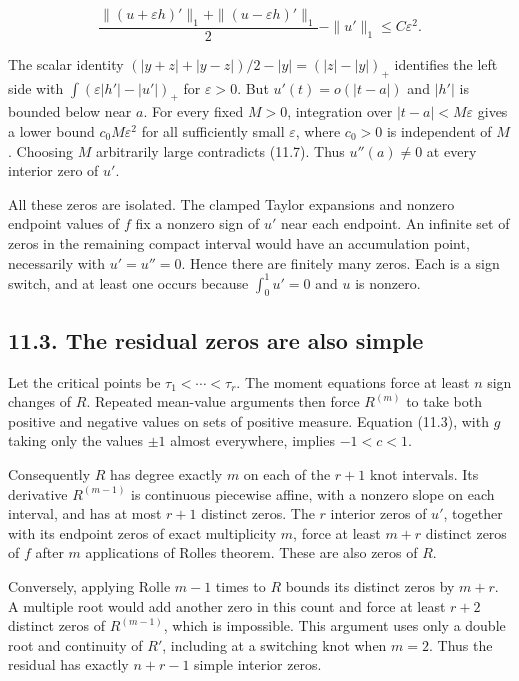 \documentclass[11pt]{article}
\begin{document}
\[
\frac{\|(u+\varepsilon h)'\|_1+\|(u-\varepsilon h)'\|_1}{2}
-\|u'\|_1\le C\varepsilon^2.
\tag{11.7}
\]

The scalar identity \((|y+z|+|y-z|)/2-|y|=(|z|-|y|)_+\) identifies the
left side with \(\int(\varepsilon|h'|-|u'|)_+\) for \(\varepsilon>0\).
But \(u'(t)=o(|t-a|)\) and \(|h'|\) is bounded below near \(a\). For
every fixed \(M>0\), integration over \(|t-a|<M\varepsilon\) gives a
lower bound \(c_0M\varepsilon^2\) for all sufficiently small
\(\varepsilon\), where \(c_0>0\) is independent of \(M\). Choosing \(M\)
arbitrarily large contradicts (11.7). Thus \(u''(a)\ne0\) at every
interior zero of \(u'\).

All these zeros are isolated. The clamped Taylor expansions and nonzero
endpoint values of \(f\) fix a nonzero sign of \(u'\) near each
endpoint. An infinite set of zeros in the remaining compact interval
would have an accumulation point, necessarily with \(u'=u''=0\). Hence
there are finitely many zeros. Each is a sign switch, and at least one
occurs because \(\int_0^1u'=0\) and \(u\) is nonzero.

\subsection{11.3. The residual zeros are also
simple}\label{the-residual-zeros-are-also-simple}

Let the critical points be \(\tau_1<\cdots<\tau_r\). The moment
equations force at least \(n\) sign changes of \(R\). Repeated
mean-value arguments then force \(R^{(m)}\) to take both positive and
negative values on sets of positive measure. Equation (11.3), with \(g\)
taking only the values \(\pm1\) almost everywhere, implies \(-1<c<1\).

Consequently \(R\) has degree exactly \(m\) on each of the \(r+1\) knot
intervals. Its derivative \(R^{(m-1)}\) is continuous piecewise affine,
with a nonzero slope on each interval, and has at most \(r+1\) distinct
zeros. The \(r\) interior zeros of \(u'\), together with its endpoint
zeros of exact multiplicity \(m\), force at least \(m+r\) distinct zeros
of \(f\) after \(m\) applications of Rolle\textquotesingle s theorem.
These are also zeros of \(R\).

Conversely, applying Rolle \(m-1\) times to \(R\) bounds its distinct
zeros by \(m+r\). A multiple root would add another zero in this count
and force at least \(r+2\) distinct zeros of \(R^{(m-1)}\), which is
impossible. This argument uses only a double root and continuity of
\(R'\), including at a switching knot when \(m=2\). Thus the residual
has exactly \(n+r-1\) simple interior zeros.
\end{document}
